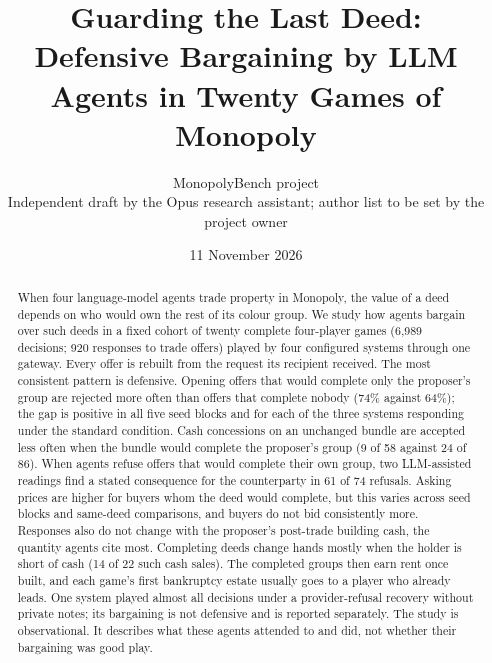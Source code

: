 \documentclass[11pt,letterpaper]{article}
\title{Guarding the Last Deed:\\Defensive Bargaining by LLM Agents in Twenty Games of Monopoly}
\author{MonopolyBench project\\{\small Independent draft by the Opus research assistant; author list to be set by the project owner}}
\date{11 November 2026}
\begin{document}





\maketitle
\begin{abstract}
When four language-model agents trade property in Monopoly, the value of a deed depends on who would own the rest of its colour group. We study how agents bargain over such deeds in a fixed cohort of twenty complete four-player games (6,989 decisions; 920 responses to trade offers) played by four configured systems through one gateway. Every offer is rebuilt from the request its recipient received. The most consistent pattern is defensive. Opening offers that would complete only the proposer's group are rejected more often than offers that complete nobody (74\% against 64\%); the gap is positive in all five seed blocks and for each of the three systems responding under the standard condition. Cash concessions on an unchanged bundle are accepted less often when the bundle would complete the proposer's group (9 of 58 against 24 of 86). When agents refuse offers that would complete their own group, two LLM-assisted readings find a stated consequence for the counterparty in 61 of 74 refusals. Asking prices are higher for buyers whom the deed would complete, but this varies across seed blocks and same-deed comparisons, and buyers do not bid consistently more. Responses also do not change with the proposer's post-trade building cash, the quantity agents cite most. Completing deeds change hands mostly when the holder is short of cash (14 of 22 such cash sales). The completed groups then earn rent once built, and each game's first bankruptcy estate usually goes to a player who already leads. One system played almost all decisions under a provider-refusal recovery without private notes; its bargaining is not defensive and is reported separately. The study is observational. It describes what these agents attended to and did, not whether their bargaining was good play.
\end{abstract}







\begingroup\small

\endgroup
\clearpage\appendix

\end{document}
